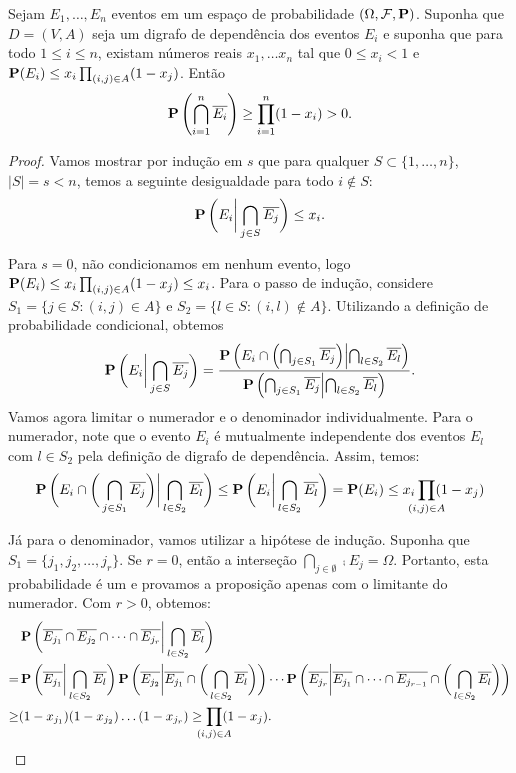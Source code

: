 \begin{lemma}
\label{thm:prob:lll}
Sejam $E_1, \dots, E_n$ eventos em um espaço de probabilidade $(\Omega, \mathcal{F}, \operatorname{\mathbf{P}})$. Suponha que $D = (V, A)$ seja um digrafo de dependência dos eventos $E_i$ e suponha que para todo $1 \leq i \leq n$, existam números reais $x_1, \dotsc x_n$ tal que $0 \leq x_i < 1$ e $\operatorname{\mathbf{P}} (E_i) \leq x_i \prod_{(i,j) \in A}(1-x_j)$. Então
\[ \operatorname{\mathbf{P}} \left( \bigcap_{i = 1}^n \overline{E_i} \right) \geq \prod_{i = 1}^n (1 - x_i) > 0.\]
\end{lemma}
\begin{proof}
Vamos mostrar por indução em $s$ que para qualquer $S \subset \{1, \dots, n\}$, $|S| = s < n$, temos a seguinte desigualdade para todo $i \not\in S$:
\[ \operatorname{\mathbf{P}}\bigg( E_i \bigg| \bigcap_{j \in S} \overline{E_j} \bigg) \leq x_i.\]

Para $s = 0$, não condicionamos em nenhum evento, logo $\operatorname{\mathbf{P}}(E_i) \leq x_i \prod_{(i,j) \in A}(1-x_j) \leq x_i$. Para o passo de indução, considere $S_1 = \{ j \in S : (i,j) \in A\}$ e $S_2 = \{ l \in S : (i,l) \not\in A \}$. Utilizando a definição de probabilidade condicional, obtemos
\begin{align*}
  \operatorname{\mathbf{P}}\bigg( E_i \bigg| \bigcap_{j \in S} \overline{E_j} \bigg) = \frac{\operatorname{\mathbf{P}}\left( E_i \cap \left(\bigcap_{j \in S_1} \overline{E_j} \right) \middle| \bigcap_{l \in S_2} \overline{E_l} \right)}{\operatorname{\mathbf{P}}\left( \bigcap_{j \in S_1} \overline{E_j} \middle| \bigcap_{l \in S_2} \overline{E_l} \right)}.
\end{align*}
Vamos agora limitar o numerador e o denominador individualmente. Para o numerador, note que o evento $E_i$ é mutualmente independente dos eventos $E_l$ com $l \in S_2$ pela definição de digrafo de dependência. Assim, temos:
\[ \prob\bigg( E_i \cap \bigg(\bigcap_{j \in S_1} \comp{E_j} \bigg) \bigg| \bigcap_{l \in S_2} \comp{E_l} \bigg) \leq \prob\bigg( E_i \bigg| \bigcap_{l \in S_2} \comp{E_l} \bigg) = \prob(E_i) \leq x_i \prod_{\mathclap{(i,j) \in A}}(1-x_j) \]

Já para o denominador, vamos utilizar a hipótese de indução. Suponha que $S_1 = \{j_1, j_2, \dots, j_r \}$. Se $r = 0$, então a interseção $\bigcap_{j \in \emptyset} \comp{E_j}  = \Omega$. Portanto, esta probabilidade é um e provamos a proposição apenas com o limitante do numerador. Com $r > 0$, obtemos:
\begin{align*}
&\prob \bigg( \comp{E_{j_1}} \cap \comp{E_{j_2}} \cap \dots \cap \comp{E_{j_r}} \bigg| \bigcap_{l \in S_2} \comp{E_l} \bigg) \\
=&\prob \bigg( \comp{E_{j_1}} \bigg| \bigcap_{l \in S_2} \comp{E_l} \bigg) \prob \bigg( \comp{E_{j_2}} \bigg| \comp{E_{j_1}} \cap \bigg(\bigcap_{l \in S_2} \comp{E_l} \bigg) \bigg) \cdots \prob \bigg( \comp{E_{j_r}} \bigg| \comp{E_{j_1}} \cap \dots \cap \comp{E_{j_{r-1}}} \cap \bigg(\bigcap_{l \in S_2} \comp{E_l}\bigg) \bigg) \\
\geq&(1-x_{j_1})(1-x_{j_2})\dots(1-x_{j_r}) \geq \prod_{\mathclap{(i,j) \in A}}(1-x_j).
\end{align*}


\end{proof}
